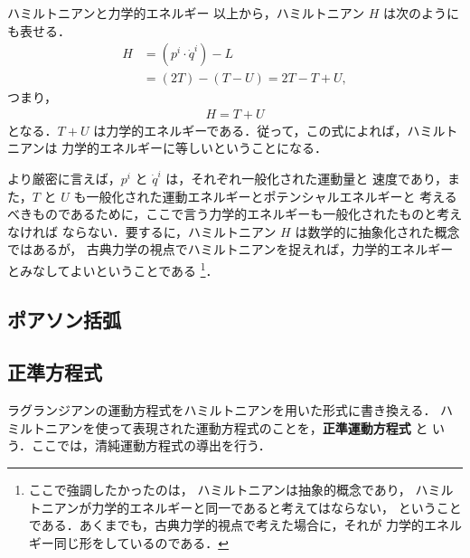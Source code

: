 \begin{mysmallsec}{ハミルトニアンと力学的エネルギー}
                    以上から，ハミルトニアン $H$ は次のようにも表せる．
                        \begin{align*}
                            H &= ({p}^{i} \cdot \dot{q}^{i}) - L \\
                              &= (2T) - (T - U) = 2T - T + U,
                        \end{align*}
                                        つまり，
                        \begin{align}
                            H = T + U
                        \end{align}
                    となる．$T+U$ は力学的エネルギーである．従って，この式によれば，ハミルトニアンは
                    力学的エネルギーに等しいということになる．

                    より厳密に言えば，${p}^{i}$ と $\dot{q}^{i}$ は，それぞれ一般化された運動量と
                    速度であり，また，$T$ と $U$ も一般化された運動エネルギーとポテンシャルエネルギーと
                    考えるべきものであるために，ここで言う力学的エネルギーも一般化されたものと考えなければ
                    ならない．要するに，ハミルトニアン $H$ は数学的に抽象化された概念ではあるが，
                    古典力学の視点でハミルトニアンを捉えれば，力学的エネルギーとみなしてよいということである
                        \footnote{
                            ここで強調したかったのは，
                            ハミルトニアンは抽象的概念であり，
                            ハミルトニアンが力学的エネルギーと同一であると考えてはならない，
                            ということである．あくまでも，古典力学的視点で考えた場合に，それが
                            力学的エネルギー同じ形をしているのである．
                        }．
                \end{mysmallsec}

        \subsection{ポアソン括弧}

        \subsection{正準方程式}
            \begin{mycomment}
                ラグランジアンの運動方程式をハミルトニアンを用いた形式に書き換える．
                ハミルトニアンを使って表現された運動方程式のことを，\textbf{正準運動方程式} と
                いう．ここでは，清純運動方程式の導出を行う．
            \end{mycomment}

